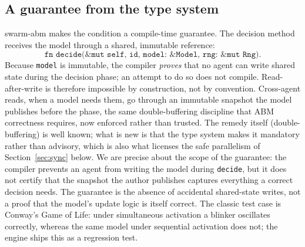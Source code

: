 \documentclass[review]{elsarticle}
\begin{document}
\subsection{A guarantee from the type system}
swarm-abm makes the condition a compile-time guarantee. The decision method
receives the model through a shared, immutable reference:
\[
\texttt{fn decide(\&mut self, id, model: \&Model, rng: \&mut Rng)} .
\]
Because \texttt{model} is immutable, the compiler \emph{proves} that no agent
can write shared state during the decision phase; an attempt to do so does not
compile. Read-after-write is therefore impossible by construction, not by
convention. Cross-agent reads, when a model needs them, go through an immutable
snapshot the model publishes before the phase, the same double-buffering
discipline that ABM correctness requires, now enforced rather than trusted. The
remedy itself (double-buffering) is well known; what is new is that the type
system makes it mandatory rather than advisory, which is also what licenses the
safe parallelism of Section~\ref{sec:sync} below. We are precise about the scope
of the guarantee: the compiler prevents an agent from writing the model during
\texttt{decide}, but it does not certify that the snapshot the author publishes
captures everything a correct decision needs. The guarantee is the absence of
accidental shared-state writes, not a proof that the model's update logic is
itself correct. The
classic test case is Conway's Game of Life: under simultaneous activation a
blinker oscillates correctly, whereas the same model under sequential
activation does not; the engine ships this as a regression test.
\end{document}
